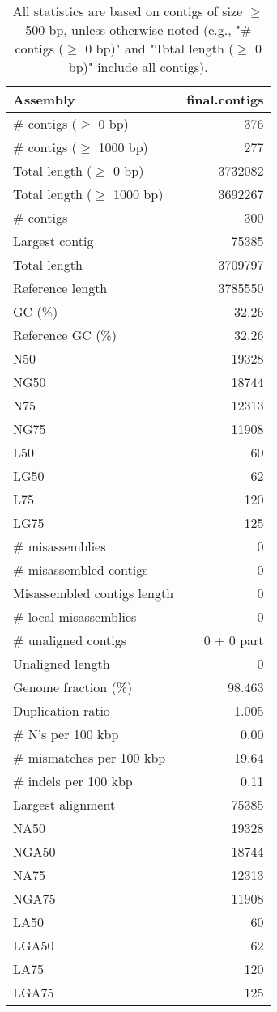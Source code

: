 \documentclass[12pt,a4paper]{article}
\begin{document}
\begin{table}[ht]
\begin{center}
\caption{All statistics are based on contigs of size $\geq$ 500 bp, unless otherwise noted (e.g., "\# contigs ($\geq$ 0 bp)" and "Total length ($\geq$ 0 bp)" include all contigs).}
\begin{tabular}{|l*{1}{|r}|}
\hline
Assembly & final.contigs \\ \hline
\# contigs ($\geq$ 0 bp) & 376 \\ \hline
\# contigs ($\geq$ 1000 bp) & 277 \\ \hline
Total length ($\geq$ 0 bp) & 3732082 \\ \hline
Total length ($\geq$ 1000 bp) & 3692267 \\ \hline
\# contigs & 300 \\ \hline
Largest contig & 75385 \\ \hline
Total length & 3709797 \\ \hline
Reference length & 3785550 \\ \hline
GC (\%) & 32.26 \\ \hline
Reference GC (\%) & 32.26 \\ \hline
N50 & 19328 \\ \hline
NG50 & 18744 \\ \hline
N75 & 12313 \\ \hline
NG75 & 11908 \\ \hline
L50 & 60 \\ \hline
LG50 & 62 \\ \hline
L75 & 120 \\ \hline
LG75 & 125 \\ \hline
\# misassemblies & 0 \\ \hline
\# misassembled contigs & 0 \\ \hline
Misassembled contigs length & 0 \\ \hline
\# local misassemblies & 0 \\ \hline
\# unaligned contigs & 0 + 0 part \\ \hline
Unaligned length & 0 \\ \hline
Genome fraction (\%) & 98.463 \\ \hline
Duplication ratio & 1.005 \\ \hline
\# N's per 100 kbp & 0.00 \\ \hline
\# mismatches per 100 kbp & 19.64 \\ \hline
\# indels per 100 kbp & 0.11 \\ \hline
Largest alignment & 75385 \\ \hline
NA50 & 19328 \\ \hline
NGA50 & 18744 \\ \hline
NA75 & 12313 \\ \hline
NGA75 & 11908 \\ \hline
LA50 & 60 \\ \hline
LGA50 & 62 \\ \hline
LA75 & 120 \\ \hline
LGA75 & 125 \\ \hline
\end{tabular}
\end{center}
\end{table}
\end{document}
